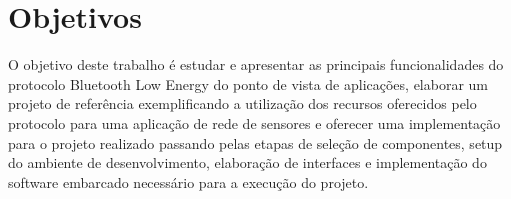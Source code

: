 \section{Objetivos}

O objetivo deste trabalho é estudar e apresentar as principais funcionalidades
do protocolo Bluetooth Low Energy do ponto de vista de aplicações, elaborar um
projeto de referência exemplificando a utilização dos recursos oferecidos pelo
protocolo para uma aplicação de rede de sensores e oferecer uma implementação
para o projeto realizado passando pelas etapas de seleção de componentes, setup
do ambiente de desenvolvimento, elaboração de interfaces e implementação do
software embarcado necessário para a execução do projeto.